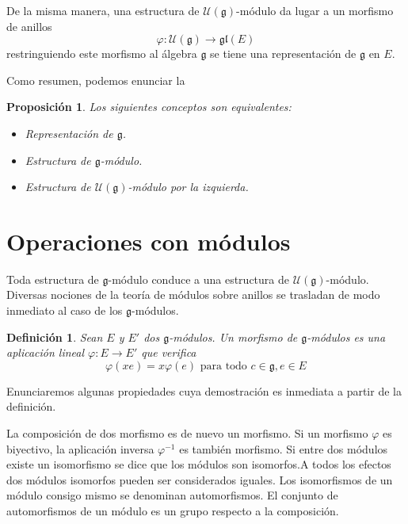 \documentclass[a4paper,draft,12pt]{scrartcl}
\newtheorem{defi}{Definición}[section]%
\newtheorem{propo}[teo]{Proposición}%
\newcommand{\g}{\mathfrak{g}}%
\newcommand{\uni}{\mathcal{U}}%
\newcommand{\lto}{\longrightarrow}%
\newcommand{\df}[1]{\textsf{\color{blue}#1}}
\begin{document}
De la misma manera, una estructura de $\uni(\g)$-módulo da lugar a un morfismo de anillos
$$
\varphi: \uni(\g) \lto \mathfrak{gl}(E)
$$
restringuiendo este morfismo al álgebra $\g$ se tiene una representación de $\g$ en $E$.

Como resumen, podemos enunciar la 

\begin{propo}

Los siguientes conceptos son equivalentes:

\begin{itemize}

\item Representación de $\g$.

\item Estructura de $\g$-módulo.

\item Estructura de $\uni(\g)$-módulo por la izquierda.

\end{itemize}

\end{propo}

\newpage

\section{Operaciones con módulos}

Toda estructura de $\g$-módulo conduce a una estructura de $\uni(\g)$-módulo.  Diversas nociones de la teoría de módulos sobre anillos se trasladan de modo inmediato al caso de los $\g$-módulos.

\begin{defi}

Sean $E$ y $E'$ dos $\g$-módulos. Un  \df{morfismo} \index{morfismo!de $\g$-módulos} de $\g$-módulos es una aplicación lineal $\varphi: E \rightarrow E'$ que verifica
$$
\varphi(xe)=x\varphi(e) \text{ para todo } c \in \g, e \in E
$$

\end{defi}

Enunciaremos algunas propiedades cuya demostración es inmediata a partir de la definición.

La composición de dos morfismo es de nuevo un morfismo.  Si un morfismo $\varphi$ es biyectivo, la aplicación inversa $\varphi^{-1}$ es también morfismo.  Si entre dos módulos existe un  \df{isomorfismo}  se dice que los módulos son isomorfos.A todos los efectos dos módulos isomorfos pueden ser considerados iguales.  Los isomorfismos de un módulo consigo mismo se denominan   \df{automorfismos}.  El conjunto de automorfismos de un módulo es un grupo respecto a la composición.
\end{document}

